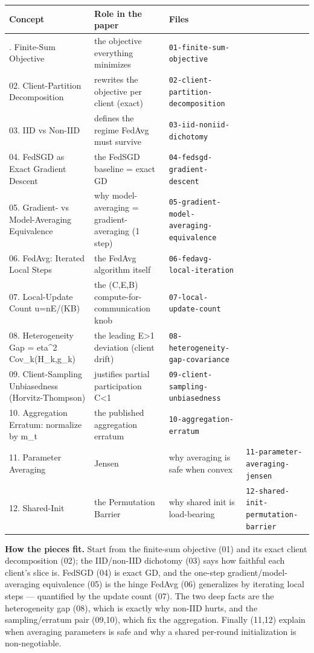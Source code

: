 \documentclass[11pt]{article}
\begin{document}
\begin{longtable}{p{} p{} p{}}
\toprule
\textbf{Concept} & \textbf{Role in the paper} & \textbf{Files} \\
\midrule
\endhead
\bottomrule
{}. Finite-Sum Objective & the objective everything minimizes & \texttt{01-finite-sum-objective} \\
02. Client-Partition Decomposition & rewrites the objective per client (exact) & \texttt{02-client-partition-decomposition} \\
03. IID vs Non-IID & defines the regime FedAvg must survive & \texttt{03-iid-noniid-dichotomy} \\
04. FedSGD as Exact Gradient Descent & the FedSGD baseline = exact GD & \texttt{04-fedsgd-gradient-descent} \\
05. Gradient- vs Model-Averaging Equivalence & why model-averaging = gradient-averaging (1 step) & \texttt{05-gradient-model-averaging-equivalence} \\
06. FedAvg: Iterated Local Steps & the FedAvg algorithm itself & \texttt{06-fedavg-local-iteration} \\
07. Local-Update Count u=nE/(KB) & the (C,E,B) compute-for-communication knob & \texttt{07-local-update-count} \\
08. Heterogeneity Gap = eta^2 Cov_k(H_k,g_k) & the leading E>1 deviation (client drift) & \texttt{08-heterogeneity-gap-covariance} \\
09. Client-Sampling Unbiasedness (Horvitz-Thompson) & justifies partial participation C<1 & \texttt{09-client-sampling-unbiasedness} \\
10. Aggregation Erratum: normalize by m_t & the published aggregation erratum & \texttt{10-aggregation-erratum} \\
11. Parameter Averaging & Jensen & why averaging is safe when convex & \texttt{11-parameter-averaging-jensen} \\
12. Shared-Init & the Permutation Barrier & why shared init is load-bearing & \texttt{12-shared-init-permutation-barrier} \\
\end{longtable}

\noindent\textbf{How the pieces fit.} Start from the finite-sum objective (01) and its exact client decomposition (02); the IID/non-IID dichotomy (03) says how faithful each client's slice is. FedSGD (04) is exact GD, and the one-step gradient/model-averaging equivalence (05) is the hinge FedAvg (06) generalizes by iterating local steps — quantified by the update count (07). The two deep facts are the heterogeneity gap (08), which is exactly why non-IID hurts, and the sampling/erratum pair (09,10), which fix the aggregation. Finally (11,12) explain when averaging parameters is safe and why a shared per-round initialization is non-negotiable.
\end{document}
